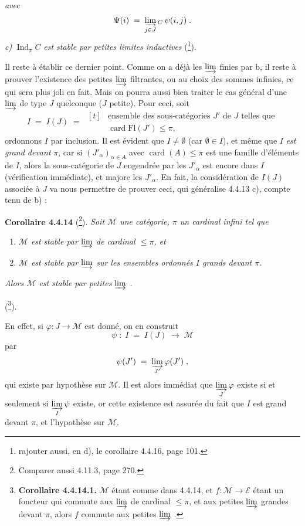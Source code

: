 \documentclass[11pt]{article}
\newcommand{\printedpage}[1]{\marginpar{\footnotesize p.~#1}}
\newcommand{\msp}[1]{\marginpar{\footnotesize [#1]}}
\newcommand{\Ind}{\operatorname{Ind}}
\newcommand{\card}{\operatorname{card}}
\newcommand{\Fl}{\mathrm{Fl}}
\begin{document}
\printedpage{24}

\textit{avec}
\[
\Psi(i) \;=\; \varinjlim_{j\in J}{}_{C}\,\psi(i,j)\;.
\]
\textit{c)} $\Ind_\pi C$ \textit{est stable par petites limites inductives} (\footnote{rajouter aussi, en d), le corollaire 4.4.16, page 101.}).

Il reste à établir ce dernier point. Comme on a déjà les $\varinjlim$ finies par b, il reste à prouver l'existence des petites $\varinjlim$ filtrantes, ou au choix des sommes infinies, ce qui sera plus joli en fait. Mais
\msp{page 97}
on pourra aussi bien traiter le cas général d'une $\varinjlim$ de type $J$ quelconque ($J$ petite). Pour ceci, soit
\[
I \;=\; I(J) \;=\; \begin{aligned}[t]
&\text{ensemble des sous-catégories } J' \text{ de } J \text{ telles que}\\
&\card\Fl(J')\leqslant\pi,
\end{aligned}
\]
ordonnons $I$ par inclusion. Il est évident que $I\neq\emptyset$ (car $\emptyset\in I$), et même que $I$ \textit{est grand devant} $\pi$, car si $(J'_\alpha)_{\alpha\in A}$ avec $\card(A)\leqslant\pi$ est une famille d'éléments de $I$, alors la sous-catégorie de $J$ engendrée par les $J'_\alpha$ est encore dans $I$ (vérification immédiate), et majore les $J'_\alpha$. En fait, la considération de $I(J)$ associée à $J$ va nous permettre de prouver ceci, qui généralise 4.4.13 c), compte tenu de b) :

\textbf{Corollaire 4.4.14} (\footnote{Comparer aussi 4.11.3, page 270.}). \textit{Soit $\mathcal{M}$ une catégorie, $\pi$ un cardinal infini tel que}
\begin{enumerate}
\item[a)] \textit{$\mathcal{M}$ est}
\msp{page 98}
\textit{stable par $\varinjlim$ de cardinal $\leqslant\pi$, et}
\item[b)] \textit{$\mathcal{M}$ est stable par $\varinjlim$ sur les ensembles ordonnés $I$ grands devant $\pi$.}
\end{enumerate}
\textit{Alors $\mathcal{M}$ est stable par petites $\varinjlim$ .}

(\footnote{\textbf{Corollaire 4.4.14.1.} $\mathcal{M}$ étant comme dans 4.4.14, et $f:\mathcal{M}\longrightarrow\mathcal{E}$ étant un foncteur qui commute aux $\varinjlim$ de cardinal $\leqslant\pi$, et aux petites $\varinjlim$ grandes devant $\pi$, alors $f$ commute aux petites $\varinjlim$ .}).

En effet, si $\varphi:J\longrightarrow\mathcal{M}$ est donné, on en construit
\[
\psi\;:\;I\;=\;I(J)\;\longrightarrow\;\mathcal{M}
\]
par
\[
\psi(J')\;=\;\varinjlim_{J'}\varphi(J')\;,
\]
qui existe par hypothèse sur $\mathcal{M}$. Il est alors immédiat que $\varinjlim\limits_{J}\varphi$ existe si et seulement si $\varinjlim\limits_{I}\psi$ existe, or cette existence est assurée du fait que $I$ est grand devant $\pi$, et l'hypothèse sur $\mathcal{M}$.
\end{document}

